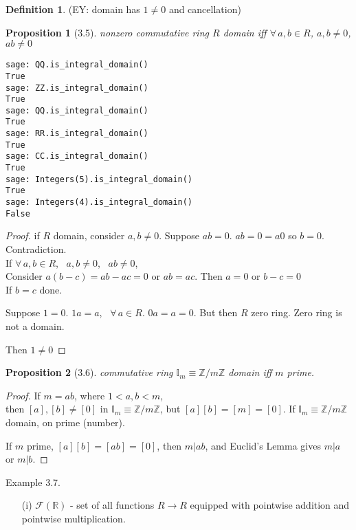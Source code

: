 \documentclass[twoside,landscape]{amsart}
\theoremstyle{plain}
\newtheorem{proposition}{Proposition}
\theoremstyle{definition}
\newtheorem{definition}{Definition}
\theoremstyle{remark}
\begin{document}
\begin{multicols*}{2}
\begin{definition}
(EY: domain has $1\neq 0$ and cancellation)
\end{definition}


\begin{proposition}[3.5]
nonzero commutative ring $R$ domain iff $\forall \, a,b \in R$, $a,b \neq 0$, $ab\neq 0$
\end{proposition}


\begin{lstlisting}
sage: QQ.is_integral_domain()
True
sage: ZZ.is_integral_domain()
True
sage: QQ.is_integral_domain()
True
sage: RR.is_integral_domain()
True
sage: CC.is_integral_domain()
True
sage: Integers(5).is_integral_domain()
True
sage: Integers(4).is_integral_domain()
False
\end{lstlisting}

\begin{proof}
  if $R$ domain, consider $a,b \neq 0$.  Suppose $ab=0$.  $ab=0 = a0$ so $b=0$.  Contradiction.  \\
If $\forall \, a,b \in R$, \, $a,b \neq 0$, \, $ab\neq 0$,  \\
Consider $a(b-c) = ab-ac=0$ or $ab=ac$.  Then $a=0$ or $b-c =0$ \\
If $b=c$ done.  

Suppose $1=0$.  $1a = a$, \, $\forall \, a \in R$.  $0a =a=0$.  But then $R$ zero ring.  Zero ring is not a domain.  

Then $1\neq 0$
\end{proof}

\begin{proposition}[3.6]
  commutative ring $\mathbb{I}_m \equiv \mathbb{Z}/m\mathbb{Z}$ domain iff $m$ prime.
  \end{proposition}

\begin{proof}
  If $m=ab$, where $1<a,b<m$, \\
  then $[a],[b]\neq [0]$ in $\mathbb{I}_m \equiv \mathbb{Z}/m\mathbb{Z}$, but $[a][b] = [m]=[0]$.  If $\mathbb{I}_m \equiv \mathbb{Z}/m\mathbb{Z}$ domain, on prime (number).

  If $m$ prime, $[a][b]=[ab] =[0]$, then $m | ab$, and Euclid's Lemma gives $m|a$ or $m|b$.

  
  \end{proof}

Example 3.7. 
\begin{enumerate}
\item[(i)] $\mathcal{F}(\mathbb{R})$ - set of all functions $R \to R$ equipped with pointwise addition and pointwise multiplication.  


\end{enumerate}
\end{multicols*}
\end{document}

